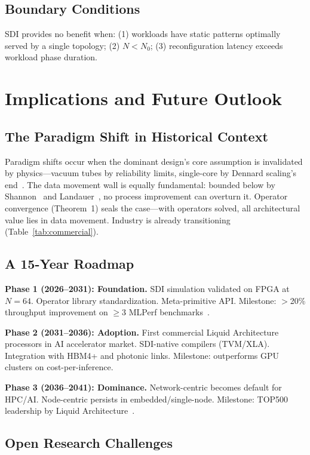 ﻿\documentclass[review,3p,twocolumn]{elsarticle}
\begin{document}
\subsection{Boundary Conditions}
SDI provides no benefit when: (1) workloads have static patterns optimally served by a single topology; (2) $N < N_0$; (3) reconfiguration latency exceeds workload phase duration.

\section{Implications and Future Outlook}
\label{sec:outlook}

\subsection{The Paradigm Shift in Historical Context}

Paradigm shifts occur when the dominant design's core assumption is invalidated by physics---vacuum tubes by reliability limits, single-core by Dennard scaling's end~\cite{dennard1974,esmaeilzadeh2011}. The data movement wall is equally fundamental: bounded below by Shannon~\cite{shannon1948} and Landauer~\cite{landauer1961,berut2012}, no process improvement can overturn it. Operator convergence (Theorem~1) seals the case---with operators solved, all architectural value lies in data movement. Industry is already transitioning (Table~\ref{tab:commercial}).

\subsection{A 15-Year Roadmap}

\textbf{Phase 1 (2026--2031): Foundation.} SDI simulation validated on FPGA at $N=64$. Operator library standardization. Meta-primitive API. Milestone: $>$20\% throughput improvement on $\geq$3 MLPerf benchmarks~\cite{mlperf2024}.

\textbf{Phase 2 (2031--2036): Adoption.} First commercial Liquid Architecture processors in AI accelerator market. SDI-native compilers (TVM/XLA). Integration with HBM4+ and photonic links. Milestone: outperforms GPU clusters on cost-per-inference.

\textbf{Phase 3 (2036--2041): Dominance.} Network-centric becomes default for HPC/AI. Node-centric persists in embedded/single-node. Milestone: TOP500 leadership by Liquid Architecture~\cite{top500}.

\subsection{Open Research Challenges}
\end{document}
